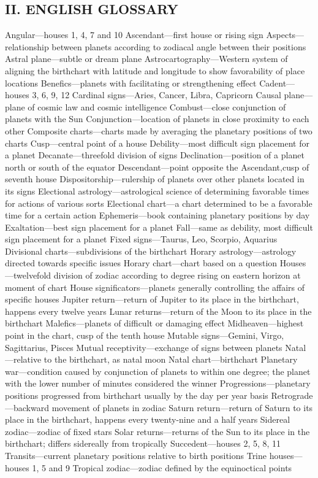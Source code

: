 \subsection{II. ENGLISH GLOSSARY}
  Angular—houses 1, 4, 7 and 10 Ascendant—first house or rising sign Aspects—relationship between planets according to zodiacal angle between their positions Astral plane—subtle or dream plane Astrocartography—Western system of aligning the birthchart with latitude and longitude to show favorability of place locations Benefics—planets with facilitating or strengthening effect   Cadent—houses 3, 6, 9, 12 Cardinal signs—Aries, Cancer, Libra, Capricorn Causal plane—plane of cosmic law and cosmic intelligence Combust—close conjunction of planets with the Sun Conjunction—location of planets in close proximity to each other Composite charts—charts made by averaging the planetary positions of two charts Cusp—central point of a house   Debility—most difficult sign placement for a planet Decanate—threefold division of signs Declination—position of a planet north or south of the equator Descendant—point opposite the Ascendant,cusp of seventh house Dispositorship—rulership of planets over other planets located in its signs   Electional astrology—astrological science of determining favorable times for actions of various sorts Electional chart—a chart determined to be a favorable time for a certain action Ephemeris—book containing planetary positions by day Exaltation—best sign placement for a planet Fall—same as debility, most difficult sign placement for a planet Fixed signs—Taurus, Leo, Scorpio, Aquarius   Divisional charts—subdivisions of the birthchart Horary astrology—astrology directed towards specific issues Horary chart—chart based on a question Houses—twelvefold division of zodiac according to degree rising on eastern horizon at moment of chart House significators—planets generally controlling the affairs of specific houses Jupiter return—return of Jupiter to its place in the birthchart, happens every twelve years Lunar returns—return of the Moon to its place in the birthchart   Malefics—planets of difficult or damaging effect Midheaven—highest point in the chart, cusp of the tenth house Mutable signs—Gemini, Virgo, Sagittarius, Pisces Mutual receptivity—exchange of signs between planets   Natal—relative to the birthchart, as natal moon Natal chart—birthchart   Planetary war—condition caused by conjunction of planets to within one degree; the planet with the lower number of minutes considered the winner Progressions—planetary positions progressed from birthchart usually by the day per year basis Retrograde—backward movement of planets in zodiac   Saturn return—return of Saturn to its place in the birthchart, happens every twenty-nine and a half years Sidereal zodiac—zodiac of fixed stars Solar returns—returns of the Sun to its place in the birthchart; differs sidereally from tropically Succedent—houses 2, 5, 8, 11   Transits—current planetary positions relative to birth positions Trine houses—houses 1, 5 and 9 Tropical zodiac—zodiac defined by the equinoctical points